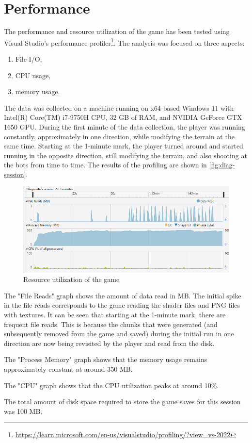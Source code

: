 \section{Performance}
The performance and resource utilization of the game has been tested using Visual Studio's performance profiler\footnote{\url{https://learn.microsoft.com/en-us/visualstudio/profiling/?view=vs-2022}}.
The analysis was focused on three aspects:
\begin{enumerate}
    \item File I/O,
    \item CPU usage,
    \item memory usage.
\end{enumerate}
The data was collected on a machine running on x64-based Windows 11 with Intel(R) Core(TM) i7-9750H CPU, 32 GB of RAM, and NVIDIA GeForce GTX 1650 GPU.
During the first minute of the data collection, the player was running constantly, approximately in one direction, while modifying the terrain at the same time.
Starting at the 1-minute mark, the player turned around and started running in the opposite direction, still modifying the terrain, and also shooting at the bots from time to time.
The results of the profiling are shown in \autoref{fig:diag-session}.
\begin{figure}[h]
    \centering
    \includegraphics[width=1\textwidth]{chapters/results/sections/performance/resources/diag-session.png}
    \caption{Resource utilization of the game}
    \label{fig:diag-session}
\end{figure}

The "File Reads" graph shows the amount of data read in MB.
The initial spike in the file reads corresponds to the game reading the shader files and PNG files with textures.
It can be seen that starting at the 1-minute mark, there are frequent file reads.
This is because the chunks that were generated (and subsequently removed from the game and saved) during the initial run in one direction are now being revisited by the player and read from the disk.

The "Process Memory" graph shows that the memory usage remains approximately constant at around 350 MB.

The "CPU" graph shows that the CPU utilization peaks at around 10\%.

The total amount of disk space required to store the game saves for this session was 100 MB.